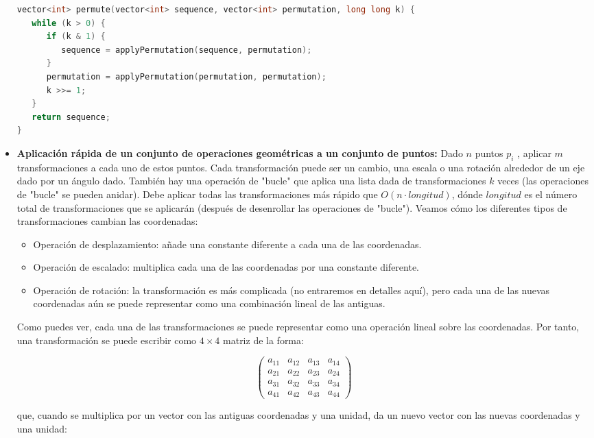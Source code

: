\begin{itemize}
\begin{lstlisting}[language=C++]
vector<int> permute(vector<int> sequence, vector<int> permutation, long long k) {
   while (k > 0) {
      if (k & 1) {
         sequence = applyPermutation(sequence, permutation);
      }
      permutation = applyPermutation(permutation, permutation);
      k >>= 1;
   }
   return sequence;
}
\end{lstlisting}
	
	\item \textbf{Aplicación rápida de un conjunto de operaciones geométricas a un conjunto de puntos:}
	Dado $n$ puntos $p_i$ , aplicar $m$ transformaciones a cada uno de estos puntos. Cada transformación puede ser un cambio, una escala o una rotación alrededor de un eje dado por un ángulo dado. También hay una operación de "bucle" que aplica una lista dada de transformaciones $k$ veces (las operaciones de "bucle" se pueden anidar). Debe aplicar todas las transformaciones más rápido que $O(n \cdot longitud)$, dónde $longitud$ es el número total de transformaciones que se aplicarán (después de desenrollar las operaciones de "bucle"). Veamos cómo los diferentes tipos de transformaciones cambian las coordenadas:
	
	\begin{itemize}
		\item Operación de desplazamiento: añade una constante diferente a cada una de las coordenadas.
		\item Operación de escalado: multiplica cada una de las coordenadas por una constante diferente.
		\item Operación de rotación: la transformación es más complicada (no entraremos en detalles aquí), pero cada una de las nuevas coordenadas aún se puede representar como una combinación lineal de las antiguas.
	\end{itemize}

	Como puedes ver, cada una de las transformaciones se puede representar como una operación lineal sobre las coordenadas. Por tanto, una transformación se puede escribir como $4 \times 4$ matriz de la forma:
	
	$$\begin{pmatrix}
		a_{11} & a_ {12} & a_ {13} & a_ {14} \\
		a_{21} & a_ {22} & a_ {23} & a_ {24} \\
		a_{31} & a_ {32} & a_ {33} & a_ {34} \\
		a_{41} & a_ {42} & a_ {43} & a_ {44}
	\end{pmatrix}$$

que, cuando se multiplica por un vector con las antiguas coordenadas y una unidad, da un nuevo vector con las nuevas coordenadas y una unidad:


\end{itemize}
